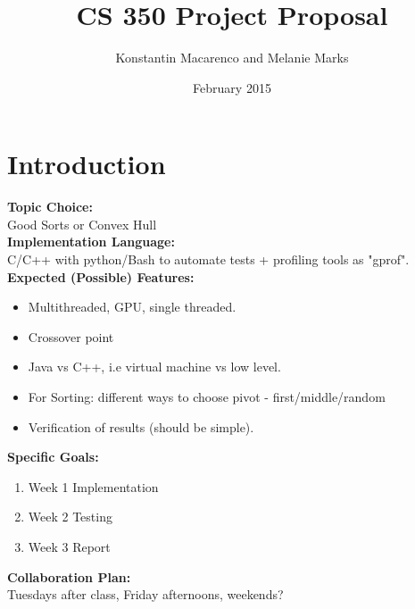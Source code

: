 \documentclass{article}
\title{CS 350 Project Proposal}
\author{Konstantin Macarenco and Melanie Marks }
\date{February 2015}
\begin{document}
\maketitle


%



\section{Introduction}
\textbf{Topic Choice:}\\
Good Sorts or Convex Hull\\
\textbf{Implementation Language:}\\
C/C++ with python/Bash to automate tests + profiling tools as "gprof".\\
\textbf{Expected (Possible) Features:} 
\begin{itemize}
\item Multithreaded, GPU, single threaded.
\item Crossover point
\item Java vs C++, i.e virtual machine vs low level.
\item For Sorting: different ways to choose pivot - first/middle/random
\item Verification of results (should be simple).
\end{itemize}
\textbf{Specific Goals:} \\
\begin{enumerate}
\item Week 1  Implementation\\
\item Week 2  Testing \\
\item Week 3  Report \\
\end{enumerate}
\textbf{Collaboration Plan: }\\
Tuesdays after class, Friday afternoons, weekends?
\end{document}
